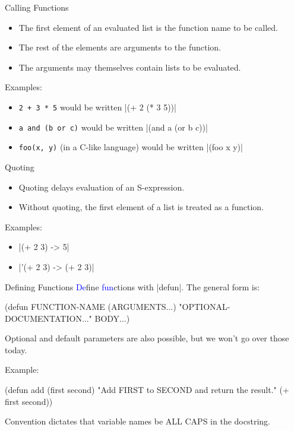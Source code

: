\documentclass{beamer}
\newcommand{\blue}[1]{\textcolor{blue}{#1}}
\begin{document}

\begin{frame}{Calling Functions}
\begin{itemize}
\item The first element of an evaluated list is the function name to be called.
\item The rest of the elements are arguments to the function.
\item The arguments may themselves contain lists to be evaluated.
\end{itemize}
Examples:
\begin{itemize}
\item \texttt{2 + 3 * 5} would be written \cl|(+ 2 (* 3 5))|
\item \texttt{a and (b or c)} would be written \cl|(and a (or b c))|
\item \texttt{foo(x, y)} (in a C-like language) would be written \cl|(foo x y)|
\end{itemize}
\end{frame}

\begin{frame}{Quoting}
  \begin{itemize}
  \item Quoting delays evaluation of an S-expression.
  \item Without quoting, the first element of a list is treated as a function.
  \end{itemize}
Examples:
\begin{itemize}
\item \cl|(+ 2 3) -> 5|
\item \cl|'(+ 2 3) -> (+ 2 3)|
\end{itemize}
\end{frame}

\begin{frame}[fragile]{Defining Functions}
\blue{De}fine \blue{fun}ctions with \cl|defun|. The general form is:
\begin{clcode}
(defun FUNCTION-NAME (ARGUMENTS...)
  "OPTIONAL-DOCUMENTATION..."
  BODY...)
\end{clcode}
Optional and default parameters are also possible, but we won't go over those today.

Example:
\begin{clcode}
(defun add (first second)
  "Add FIRST to SECOND and return the result."
  (+ first second))
\end{clcode}
Convention dictates that variable names be ALL CAPS in the docstring.
\end{frame}

\end{document}
